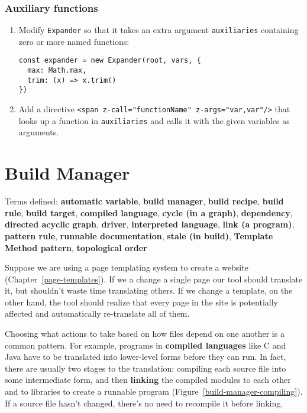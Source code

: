 \documentclass[krantzl]{krantz}
\newcommand{\chapref}[1]{Chapter~\ref{#1}}
\newcommand{\figref}[1]{Figure~\ref{#1}}
\newcommand{\glossref}[1]{\textbf{#1}}
\begin{document}
\subsection*{Auxiliary functions}

\begin{enumerate}

\item 

Modify \texttt{Expander} so that it takes an extra argument \texttt{auxiliaries}
    containing zero or more named functions:

\begin{lstlisting}[frame=tblr]
const expander = new Expander(root, vars, {
  max: Math.max,
  trim: (x) => x.trim()
})
\end{lstlisting}



\item 

Add a directive \texttt{<span z-call="functionName" z-args="var,var"/>}
    that looks up a function in \texttt{auxiliaries} and calls it
    with the given variables as arguments.



\end{enumerate}

\chapter{Build Manager}\label{build-manager}


\noindent 
  Terms defined: \glossref{automatic variable}, \glossref{build manager}, \glossref{build recipe}, \glossref{build rule}, \glossref{build target}, \glossref{compiled language}, \glossref{cycle (in a graph)}, \glossref{dependency}, \glossref{directed acyclic graph}, \glossref{driver}, \glossref{interpreted language}, \glossref{link (a program)}, \glossref{pattern rule}, \glossref{runnable documentation}, \glossref{stale (in build)}, \glossref{Template Method pattern}, \glossref{topological order}



Suppose we are using a page templating system to create a website (\chapref{page-templates}).
If we a change a single page our tool should translate it,
but shouldn’t waste time translating others.
If we change a template,
on the other hand,
the tool should realize that every page in the site is potentially affected
and automatically re-translate all of them.


Choosing what actions to take based on how files depend on one another is a common pattern.
For example,
programs in \glossref{compiled languages}
like C and Java
have to be translated into lower-level forms before they can run.
In fact,
there are usually two stages to the translation:
compiling each source file into some intermediate form,
and then \glossref{linking} the compiled modules
to each other and to libraries
to create a runnable program
(\figref{build-manager-compiling}).
If a source file hasn’t changed,
there’s no need to recompile it before linking.
\end{document}
